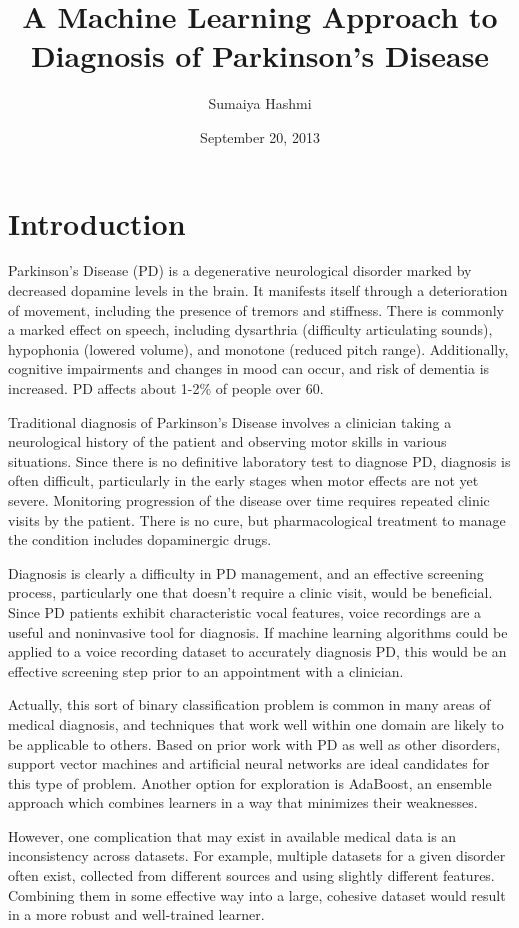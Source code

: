 \documentclass[draftcopy]{srpaper}
\title{A Machine Learning Approach to Diagnosis of Parkinson's Disease}
\author{Sumaiya Hashmi}
\date{September 20, 2013}
\begin{document}
\frontmatter
\chapter{Introduction}
\label{Chapter:One}
Parkinson's Disease (PD) is a degenerative neurological disorder
marked by decreased dopamine levels in the brain. It manifests itself
through a deterioration of movement,
including the presence of tremors and stiffness. There is commonly a
marked effect on speech, including dysarthria (difficulty articulating
sounds), hypophonia (lowered volume), and monotone (reduced pitch
range). Additionally, 
cognitive impairments and changes in mood can occur, and risk of
dementia is increased. PD affects about
1-2\% of people over 60.

Traditional diagnosis of Parkinson's Disease involves a clinician taking a
neurological history of the patient and observing motor skills in
various situations. Since there is no definitive laboratory test to
diagnose PD, diagnosis is often difficult, particularly in the early
stages when motor effects are not yet severe. Monitoring progression of the disease over time requires repeated clinic visits by the patient. There is no cure, but pharmacological treatment to
manage the condition includes dopaminergic drugs. 

Diagnosis is clearly a difficulty in PD management, and an effective
screening process, particularly one that doesn't require a clinic
visit, would be beneficial. Since PD patients exhibit characteristic
vocal features, voice recordings are a useful and noninvasive tool for
diagnosis. If machine learning algorithms could be applied to a voice recording
dataset to accurately diagnosis PD, this would be an effective screening step prior to an
appointment with a clinician.

Actually, this sort of binary classification problem is common
in many areas of medical diagnosis, and techniques that work well
within one domain are likely to be applicable to others. Based on
prior work with PD as well as other disorders, support vector machines
and artificial neural networks are ideal candidates for this type of
problem. Another option for exploration is AdaBoost, an ensemble
approach which combines learners in a way that minimizes their weaknesses. 

However, one
complication that may exist in available medical data is an
inconsistency across datasets. For example, multiple datasets for a given
disorder often exist, collected from different sources and using
slightly different features. Combining them in some effective way into
a large, cohesive dataset would result in a more robust and
well-trained learner. 
\end{document}

